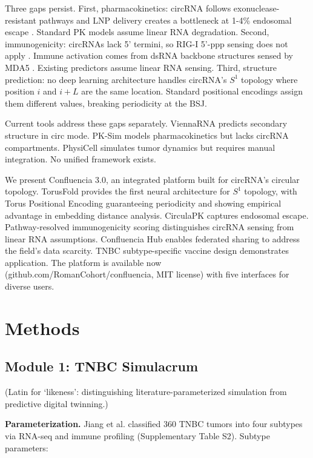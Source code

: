 \documentclass[11pt,a4paper]{article}
\begin{document}
Three gaps persist. First, pharmacokinetics: circRNA follows exonuclease-resistant pathways and LNP delivery creates a bottleneck at 1-4\% endosomal escape \citep{gilleron2013}. Standard PK models assume linear RNA degradation. Second, immunogenicity: circRNAs lack 5' termini, so RIG-I 5'-ppp sensing does not apply \citep{hornung2006}. Immune activation comes from dsRNA backbone structures sensed by MDA5 \citep{chen2019,peisley2013}. Existing predictors assume linear RNA sensing. Third, structure prediction: no deep learning architecture handles circRNA's $S^1$ topology where position $i$ and $i+L$ are the same location. Standard positional encodings assign them different values, breaking periodicity at the BSJ.

Current tools address these gaps separately. ViennaRNA predicts secondary structure in circ mode. PK-Sim models pharmacokinetics but lacks circRNA compartments. PhysiCell simulates tumor dynamics but requires manual integration. No unified framework exists.

We present Confluencia 3.0, an integrated platform built for circRNA's circular topology. TorusFold provides the first neural architecture for $S^1$ topology, with Torus Positional Encoding guaranteeing periodicity and showing empirical advantage in embedding distance analysis. CirculaPK captures endosomal escape. Pathway-resolved immunogenicity scoring distinguishes circRNA sensing from linear RNA assumptions. Confluencia Hub enables federated sharing to address the field's data scarcity. TNBC subtype-specific vaccine design demonstrates application. The platform is available now (github.com/RomanCohort/confluencia, MIT license) with five interfaces for diverse users.

\section{Methods}

\subsection{Module 1: TNBC Simulacrum}

(Latin for `likeness': distinguishing literature-parameterized simulation from predictive digital twinning.)

\textbf{Parameterization.} Jiang et al. \citep{jiang2019} classified 360 TNBC tumors into four subtypes via RNA-seq and immune profiling (Supplementary Table S2). Subtype parameters:
\end{document}

